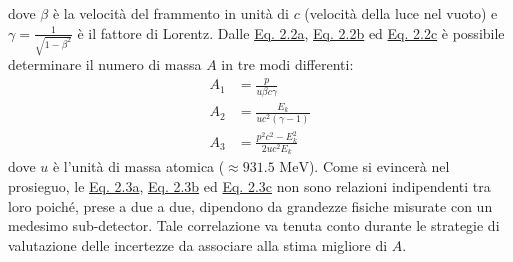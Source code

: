 \documentclass[12pt,a4paper,twoside]{report}
\begin{document}
	dove $\beta$ è la velocità del frammento in unità di $c$ (velocità della luce nel vuoto) e $\gamma=\frac{1}{\sqrt{1-\beta^2}}$ è il fattore di Lorentz. Dalle \hyperref[eq:momentum]{Eq. 2.2a}, \hyperref[eq:kinetic_energy1]{Eq. 2.2b} ed \hyperref[eq:kinetic_energy2]{Eq. 2.2c} è possibile determinare il numero di massa $A$ in tre modi differenti:
	\begin{subequations}
		\begin{align}
			\label{eq:a1}
			A_1&=\frac{p}{u\beta c\gamma}\\
			\label{eq:a2}
			A_2&=\frac{E_k}{uc^2\left(\gamma-1\right)}\\
			\label{eq:a3}
			A_3&=\frac{p^2c^2-E_k^2}{2uc^2E_k}
		\end{align}
	\end{subequations}
	dove $u$ è l'unità di massa atomica ($\approx931.5\mbox{ MeV}$). Come si evincerà nel prosieguo, le \hyperref[eq:a1]{Eq. 2.3a}, \hyperref[eq:a2]{Eq. 2.3b} ed \hyperref[eq:a3]{Eq. 2.3c} non sono relazioni indipendenti tra loro poiché, prese a due a due, dipendono da grandezze fisiche misurate con un medesimo sub-detector. Tale correlazione va tenuta conto durante le strategie di valutazione delle incertezze da associare alla stima migliore di $A$.
	
\end{document}
